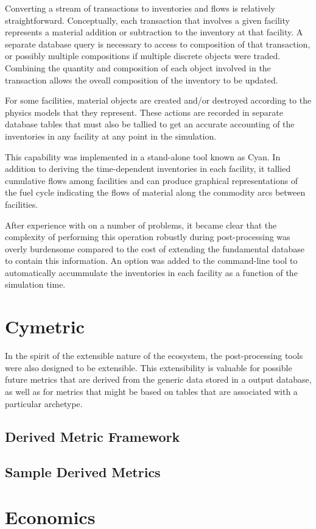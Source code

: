 Converting a stream of transactions to inventories and flows is relatively
straightforward.  Conceptually, each transaction that involves a given
facility represents a material addition or subtraction to the inventory at
that facility.  A separate database query is necessary to access to
composition of that transaction, or possibly multiple compositions if multiple
discrete objects were traded.  Combining the quantity and composition of each
object involved in the transaction allows the oveall composition of the
inventory to be updated.

For some facilities, material objects are created and/or destroyed according
to the physics models that they represent.  These actions are recorded in
separate database tables that must also be tallied to get an accurate
accounting of the inventories in any facility at any point in the simulation.

This capability was implemented in a stand-alone tool known as Cyan.  In
addition to deriving the time-dependent inventories in each facility, it
tallied cumulative flows among facilities and can produce graphical
representations of the fuel cycle indicating the flows of material along the
commodity arcs between facilities.

After experience with \Cyclus on a number of problems, it became clear that
the complexity of performing this operation robustly during post-processing
was overly burdensome compared to the cost of extending the fundamental
\Cyclus database to contain this information.  An option was added to the
\Cyclus command-line tool to automatically accummulate the inventories in each
facility as a function of the simulation time.

\section{Cymetric}

In the spirit of the extensible nature of the \Cyclus ecosystem, the
post-processing tools were also designed to be extensible.  This extensibility
is valuable for possible future metrics that are derived from the generic data
stored in a \Cyclus output database, as well as for metrics that might be
based on tables that are associated with a particular archetype.


\subsection{Derived Metric Framework}

\subsection{Sample Derived Metrics}

\section{Economics}
